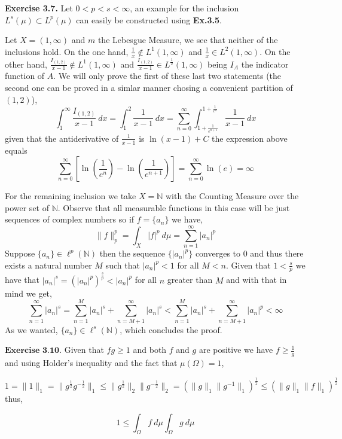 \documentclass{article}
\begin{document}
\begin{exercise}\textbf{Exercise 3.7.}
    Let $0 < p < s < \infty$, an example for the inclusion $L^s \left(  \mu\right)  \subset L^p \left( \mu \right) $ can easily be constructed using \textbf{Ex.3.5}.

    Let $X = \left( 1, \infty \right) $ and $m$ the Lebesgue Measure, we see that neither of the inclusions hold. On the one hand, $\frac{1}{x} \notin L^1 \left( 1, \infty \right)$ and $\frac{1}{x} \in L^2 \left( 1, \infty \right) $. On the other hand, $\frac{I_{ \left( 1,2 \right) }}{ x-1} \notin L^1 \left( 1,\infty \right) $ and $\frac{I_{ \left( 1,2 \right) }}{x-1} \in L^{\frac{1}{2}} \left( 1,\infty \right) $ being $I_A$ the indicator function of $A$. We will only prove the first of these last two statements (the second one can be proved in a simlar manner chosing a convenient partition of $ \left( 1,2 \right) $),
    \[
        \int_{1}^{\infty}\frac{I_{ \left( 1,2 \right) }}{x-1} \: dx  = \int_{1}^{2} \frac{1}{x-1}\: dx = \sum_{n=0}^{\infty} \int_{1+\frac{1}{e^{n+1}}}^{1+\frac{1}{e^n}} \frac{1}{x-1}\: dx 
    \]
    given that the antiderivative of $\frac{1}{x-1}$ is $\ln \left( x-1 \right) + C$ the expression above equals
    \[
        \sum_{n=0}^{\infty} \left [\ln \left( \frac{1}{e^n} \right)  - \ln \left( \frac{1}{e^{n+1}} \right) \right] = \sum_{n=0}^{\infty} \ln \left( e \right) = \infty 
    \]

    For the remaining inclusion we take $X = \mathbb{N}$ with the Counting Measure over the power set of $\mathbb{N}$. Observe that all measurable functions in this case will be just sequences of complex numbers so if $f=\{a_n\}$ we have,
    \[
        \|f\|_p^p = \int_X |f|^p\: d\mu = \sum_{n=1}^{\infty} |a_n|^p 
    \]
    Suppose $\{a_n\} \in \ell^p \left( \mathbb{N} \right)$ then the sequence $\{|a_n|^p\}$ converges to 0 and thus there exists a natural number $M$ such that $|a_n|^p < 1$ for all $M < n$. Given that $1 < \frac{s}{p}$ we have that $|a_n|^s = \left( |a_n|^p \right)^\frac{s}{p} < |a_n|^p$ for all $n$ greater than $M$ and with that in mind we get,
    \[
       \sum_{n=1}^{\infty} |a_n|^s = \sum_{n=1}^{M} |a_n|^s + \sum_{n=M+1}^{\infty} |a_n|^s < \sum_{n=1}^{M} |a_n|^s + \sum_{n=M+1}^{\infty} |a_n|^p < \infty  
    \]
    As we wanted, $\{a_n\} \in \ell ^s \left( \mathbb{N} \right) $, which concludes the proof.
\end{exercise}

\bigbreak

\begin{exercise}$\textbf{Exercise 3.10.}$
Given that $fg\ge1$ and both $f$ and $g$ are positive we have $f \ge \frac{1}{g}$ and using Holder's inequality and the fact that $\mu\left(\Omega\right)=1$,

\[
    1 = \|1\|_1 = \|g^{\frac{1}{2}}g^{-\frac{1}{2}}\|_1 \le \|g^{\frac{1}{2}}\|_2 \|g^{-\frac{1}{2}}\|_2 =  \left( \|g\|_1 \|g^{-1}\|_1 \right) ^{\frac{1}{2}} \le \left(\|g\|_1 \|f\|_1 \right)^{\frac{1}{2}} 
\]
thus,

\[
    1 \le \int_\Omega f\: d\mu \int_\Omega g\: d\mu  
\]

\end{exercise}
\end{document}

